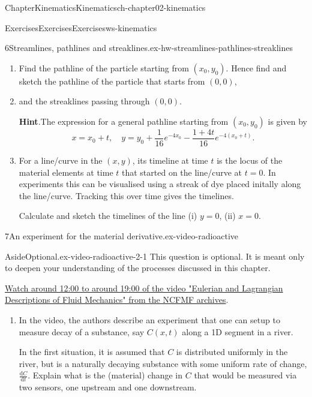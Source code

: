 \documentclass[oneside,10pt,]{book}
\newcommand{\blocktitlefont}{\relax}
\numberwithin{equation}{section}
\newcommand{\de}{\mathrm{d}}
\newcommand{\dd}[2]{\frac{\de#1}{\de#2}}
\begin{document}
\begin{chapterptx}{Chapter}{Kinematics}{}{Kinematics}{}{}{ch-chapter02-kinematics}
\begin{exercises-section}{Exercises}{Exercises}{}{Exercises}{}{}{ws-kinematics}
\begin{divisionexercise}{6}{Streamlines, pathlines and streaklines.}{}{ex-hw-streamlines-pathlines-streaklines}
\begin{enumerate}[font=\bfseries,label=(\alph*),ref=\alph*]
%
\begin{equation*}
x = x_0 + t,\quad
y = y_0 + \frac{1}{16} e^{-4x_0} - \frac{1+4t}{16} e^{-4(x_0+t)}.
\end{equation*}
\item{}Find the pathline of the particle starting from \((x_0,y_0)\). Hence find and sketch the pathline of the particle that starts from \((0,0)\),%
\item{}and the streaklines passing through \((0,0)\).%
\par\smallskip%
\noindent\textbf{\blocktitlefont Hint}.\hypertarget{ex-hw-streamlines-pathlines-streaklines-6-2}{}\quad{}The expression for a general pathline starting from \((x_0,y_0)\) is given by%
\begin{equation*}
x = x_0 + t,\quad
y = y_0 + \frac{1}{16} e^{-4x_0} - \frac{1+4t}{16} e^{-4(x_0+t)}.
\end{equation*}
%
\item{}For a line\slash{}curve in the \((x,y)\), its timeline at time \(t\) is the locus of the material elements at time \(t\) that started on the line\slash{}curve at \(t=0\). In experiments this can be visualised using a streak of dye placed initally along the line\slash{}curve. Tracking this over time gives the timelines.%
\par
Calculate and sketch the timelines of the line (i) \(y=0\), (ii) \(x=0\).%
\end{enumerate}%
\end{divisionexercise}%
\begin{divisionexercise}{7}{An experiment for the material derivative.}{}{ex-video-radioactive}%
\begin{aside}{Aside}{Optional.}{ex-video-radioactive-2-1}%
This question is optional. It is meant only to deepen your understanding of the processes discussed in this chapter.%
\end{aside}
 \href{https://techtv.mit.edu/collections/ifluids/videos/32597-eulerian-and-lagrangian-descriptions-in-fluid-mechanics}{Watch around 12:00 to around 19:00 of the video "Eulerian and Lagrangian Descriptions of Fluid Mechanics" from the NCFMF archives}.%
\begin{enumerate}[font=\bfseries,label=(\alph*),ref=\alph*]%
\item{}In the video, the authors describe an experiment that one can setup to measure decay of a substance, say \(C(x, t)\) along a 1D segment in a river.%
\par
In the first situation, it is assumed that \(C\) is distributed uniformly in the river, but is a naturally decaying substance with some uniform rate of change, \(\dd{C}{t}\). Explain what is the (material) change in \(C\) that would be measured via two sensors, one upstream and one downstream.%

\end{enumerate}
\end{divisionexercise}
\end{exercises-section}
\end{chapterptx}
\end{document}
